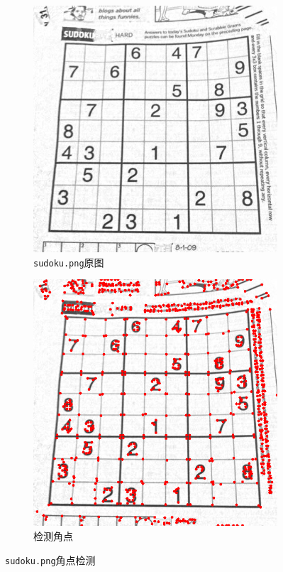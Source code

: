 \documentclass[a4paper, utf8]{ctexart}
\begin{document}
	\begin{figure}[htbp]
		\centering
		\begin{subfigure}{.45\textwidth}
			\centering
			\includegraphics[height=.15\textheight]{./figure/sudoku.png}
			\caption{\texttt{sudoku.png}原图}
		\end{subfigure}
		\begin{subfigure}{.45\textwidth}
			\centering
			\includegraphics[height=.15\textheight]{./figure/sudoku_keypoints.png}
			\caption{检测角点}
		\end{subfigure}
		\caption{\texttt{sudoku.png}角点检测}
	\end{figure}
	
\end{document}
